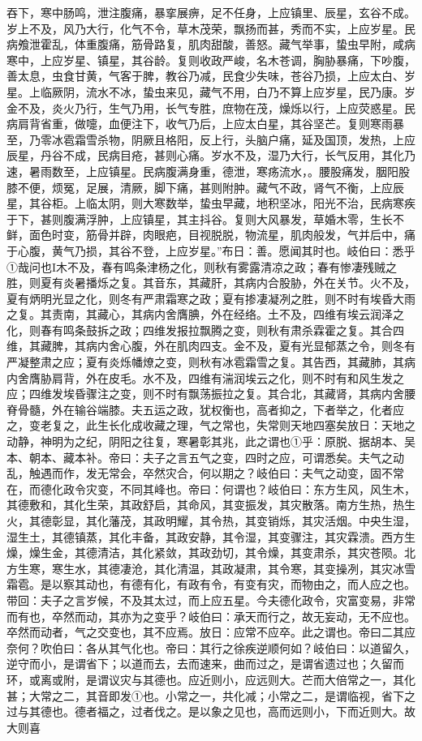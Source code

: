 \documentclass[a4paper,12pt,UTF8,twoside]{ctexbook}
\begin{document}
吞下，寒中肠鸣，泄注腹痛，暴挛展痹，足不任身，上应镇里、辰星，玄谷不成。岁上不及，风乃大行，化气不令，草木茂荣，飘扬而甚，秀而不实，上应岁星。民病飧泄霍乱，体重腹痛，筋骨路复，肌肉甜酸，善怒。藏气举事，蛰虫早附，咸病寒中，上应岁星、镇星，其谷龄。复则收政严峻，名木苍调，胸胁暴痛，下吵腹，善太息，虫食甘黄，气客于脾，教谷乃减，民食少失味，苍谷乃损，上应太白、岁星。上临厥阴，流水不冰，蛰虫来见，藏气不用，白乃不算上应岁星，民乃康。岁金不及，炎火乃行，生气乃用，长气专胜，庶物在茂，燥烁以行，上应荧惑星。民病肩背省重，做嚏，血便注下，收气乃后，上应太白星，其谷坚芒。复则寒雨暴至，乃零冰雹霜雪杀物，阴厥且格阳，反上行，头脑户痛，延及国顶，发热，上应辰星，丹谷不成，民病目疮，甚则心痛。岁水不及，湿乃大行，长气反用，其化乃速，暑雨数至，上应镇星。民病腹满身重，德泄，寒疡流水，。腰股痛发，胭阳股膝不便，烦冤，足展，清厥，脚下痛，甚则附肿。藏气不政，肾气不衡，上应辰星，其谷柜。上临太阴，则大寒数举，蛰虫早藏，地积坚冰，阳光不治，民病寒疾于下，甚则腹满浮肿，上应镇星，其主抖谷。复则大风暴发，草婚木零，生长不鲜，面色时变，筋骨并辟，肉眼疤，目视脱脱，物流星，肌肉般发，气并后中，痛于心腹，黄气乃损，其谷不登，上应岁星。”布日：善。愿闻其时也。岐伯曰：悉乎①哉问也I木不及，春有鸣条津杨之化，则秋有雾露清凉之政；春有惨凄残贼之胜，则夏有炎暑播烁之复。其音东，其藏肝，其病内合股胁，外在关节。火不及，夏有炳明光显之化，则冬有严肃霜寒之政；夏有掺凄凝冽之胜，则不时有埃昏大雨之复。其责南，其藏心，其病内舍膺腆，外在经络。土不及，四维有埃云润泽之化，则春有鸣条鼓拆之政；四维发报拉飘腾之变，则秋有肃杀霖霍之复。其合四维，其藏脾，其病内舍心腹，外在肌肉四支。金不及，夏有光显郁蒸之令，则冬有严凝整肃之应；夏有炎烁幡燎之变，则秋有冰雹霜雪之复。其告西，其藏肺，其病内舍膺胁肩背，外在皮毛。水不及，四维有湍润埃云之化，则不时有和风生发之应；四维发埃昏骤注之变，则不时有飘荡振拉之复。其合北，其藏肾，其病内舍腰脊骨髓，外在输谷端膝。夫五运之政，犹权衡也，高者抑之，下者举之，化者应之，变老复之，此生长化成收藏之理，气之常也，失常则天地四塞矣放日：天地之动静，神明为之纪，阴阳之往复，寒暑彰其兆，此之谓也①乎：原脱、据胡本、吴本、朝本、藏本补。帝曰：夫子之言五气之变，四时之应，可谓悉矣。夫气之动乱，触遇而作，发无常会，卒然灾合，何以期之？岐伯曰：夫气之动变，固不常在，而德化政令灾变，不同其峰也。帝曰：何谓也？岐伯曰：东方生风，风生木，其德敷和，其化生荣，其政舒启，其命风，其变振发，其灾散落。南方生热，热生火，其德彰显，其化藩茂，其政明耀，其令热，其变销烁，其灾活烟。中央生湿，湿生土，其德镇蒸，其化丰备，其政安静，其令湿，其变骤注，其灾霖溃。西方生燥，燥生金，其德清洁，其化紧敛，其政劲切，其令燥，其变肃杀，其灾苍陨。北方生寒，寒生水，其德凄沧，其化清温，其政凝肃，其令寒，其变操冽，其灾冰雪霜雹。是以察其动也，有德有化，有政有令，有变有灾，而物由之，而人应之也。带回：夫子之言岁候，不及其太过，而上应五星。今夫德化政令，灾富变易，非常而有也，卒然而动，其亦为之变乎？岐伯曰：承天而行之，故无妄动，无不应也。卒然而动者，气之交变也，其不应焉。放日：应常不应卒。此之谓也。帝曰二其应奈何？吹伯曰：各从其气化也。帝曰：其行之徐疾逆顺何如？岐伯曰：以道留久，逆守而小，是谓省下；以道而去，去而速来，曲而过之，是谓省遗过也；久留而环，或离或附，是谓议灾与其德也。应近则小，应远则大。芒而大倍常之一，其化甚；大常之二，其音即发①也。小常之一，共化减；小常之二，是谓临视，省下之过与其德也。德者福之，过者伐之。是以象之见也，高而远则小，下而近则大。故大则喜
\end{document}
